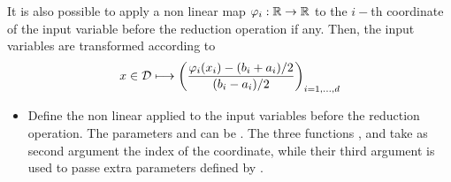 It is also possible to apply a non linear map $\varphi_i:{\mathbb R} \to {\mathbb R}$ to the $i-$th coordinate of the input variable before the reduction operation if any. Then, the input variables are transformed according to
\begin{equation}
  \label{basis_non_linear_reduced}
  x \in {\mathcal D} \longmapsto \left(\frac{\varphi_i(x_i) - (b_i+a_i)/2}{(b_i - a_i)/2}
  \right)_{i=1,\dots,d}
\end{equation}


\begin{itemize}
\item {}
\sshortdescribe Define the non linear applied to the input variables before the reduction operation. The parameters  and  can be . The three functions ,  and  take as second argument the index of the coordinate, while their third argument is used to passe extra parameters defined by .
\end{itemize}

